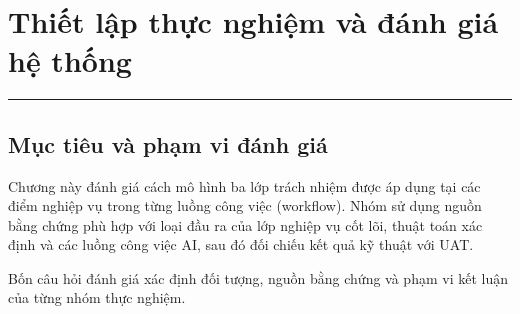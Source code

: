 \chapter{Thiết lập thực nghiệm và đánh giá hệ thống}
\label{Chapter4}

\par\noindent\rule{\textwidth}{0.4pt}\par

\section{Mục tiêu và phạm vi đánh giá}

Chương này đánh giá cách mô hình ba lớp trách nhiệm được áp dụng tại các điểm nghiệp vụ trong từng luồng công việc (workflow). Nhóm sử dụng nguồn bằng chứng phù hợp với loại đầu ra của lớp nghiệp vụ cốt lõi, thuật toán xác định và các luồng công việc AI, sau đó đối chiếu kết quả kỹ thuật với UAT.

Bốn câu hỏi đánh giá xác định đối tượng, nguồn bằng chứng và phạm vi kết luận của từng nhóm thực nghiệm.

